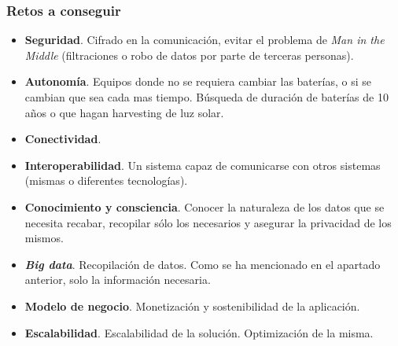 \documentclass[12pt]{article}
\begin{document}
	
	
	\subsubsection{Retos a conseguir}
	\begin{itemize}
		\item \textbf{Seguridad}. Cifrado en la comunicación, evitar el problema de \textit{Man in the Middle} (filtraciones o robo de datos por parte de terceras personas).
		\item \textbf{Autonomía}. Equipos donde no se requiera cambiar las baterías, o si se cambian que sea cada mas tiempo. Búsqueda de duración de baterías de 10 años o que hagan harvesting de luz solar.
		\item \textbf{Conectividad}.
		\item \textbf{Interoperabilidad}. Un sistema capaz de comunicarse con otros sistemas (mismas o diferentes tecnologías).
		\item \textbf{Conocimiento y consciencia}. Conocer la naturaleza de los datos que se necesita recabar, recopilar sólo los necesarios y asegurar la privacidad de los mismos.
		\item \textbf{\textit{Big data}}. Recopilación de datos. Como se ha mencionado en el apartado anterior, solo la información necesaria.
		\item \textbf{Modelo de negocio}. Monetización y sostenibilidad de la aplicación.
		\item \textbf{Escalabilidad}. Escalabilidad de la solución. Optimización de la misma.
	\end{itemize}

	\pagebreak
\end{document}
